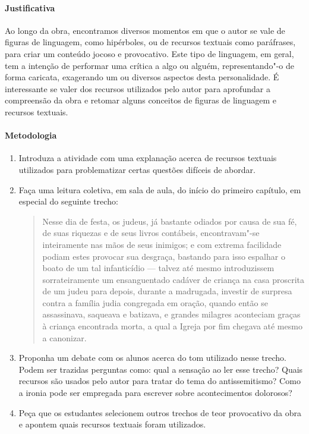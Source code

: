 \documentclass[12pt]{extarticle}
\begin{document}
\paragraph{Justificativa} Ao longo da obra, encontramos diversos momentos em que o
autor se vale de figuras de linguagem, como hipérboles, ou de recursos
textuais como paráfrases, para criar um conteúdo jocoso e provocativo.
Este tipo de linguagem, em geral, tem a intenção de performar uma
crítica a algo ou alguém, representando"-o de forma caricata, exagerando
um ou diversos aspectos desta personalidade. É interessante se valer dos recursos
utilizados pelo autor para aprofundar a compreensão da obra e retomar alguns conceitos
de figuras de linguagem e recursos textuais.

\paragraph{Metodologia}

\begin{enumerate} 

\item Introduza a atividade com uma explanação acerca de recursos textuais
utilizados para problematizar certas questões difíceis de abordar. 

\item Faça uma leitura coletiva, em sala de aula, do início do primeiro capítulo,
em especial do seguinte trecho:

\begin{quote}
Nesse dia de festa, os judeus,
já bastante odiados por causa de sua fé, de suas riquezas e de seus
livros contábeis, encontravam"-se inteiramente nas mãos de seus
inimigos; e com extrema facilidade podiam estes provocar sua desgraça,
bastando para isso espalhar o boato de um tal infanticídio --- talvez até
mesmo introduzissem sorrateiramente um ensanguentado cadáver de criança
na casa proscrita de um judeu para depois, durante a madrugada,
investir de surpresa contra a família judia congregada em oração,
quando então se assassinava, saqueava e batizava, e grandes milagres
aconteciam graças à criança encontrada morta, a qual a Igreja por fim
chegava até mesmo a canonizar.
\end{quote}

\item Proponha um debate com os alunos acerca do tom utilizado nesse trecho. 
Podem ser trazidas perguntas como: qual a sensação ao ler esse trecho?
Quais recursos são usados pelo autor para tratar do tema do antissemitismo?
Como a ironia pode ser empregada para escrever sobre acontecimentos dolorosos?

\item Peça que os estudantes selecionem outros trechos de teor provocativo da obra
e apontem quais recursos textuais foram utilizados.

\end{enumerate}
\end{document}
